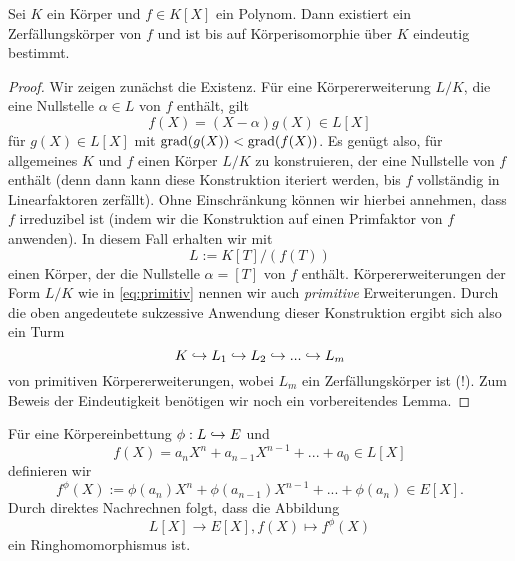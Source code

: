 \documentclass{book}
\begin{document}
\begin{thm}
    \label{thm:zerfexun}
    Sei $K$ ein Körper und $f \in K[X]$ ein Polynom. Dann existiert ein
    Zerfällungskörper von $f$ und ist bis auf Körperisomorphie über $K$
    eindeutig bestimmt.
\end{thm}
\begin{proof}
    Wir zeigen zunächst die Existenz. Für eine Körpererweiterung $L/K$, die eine Nullstelle $\alpha \in L$ von $f$ enthält, gilt
    \[
        f(X) = (X-\alpha) g(X) \in L[X]
    \]
    für $g(X) \in L[X]$ mit $\operatorname{grad}(g(X)) < \operatorname{grad}(f(X))$. Es genügt also, für
    allgemeines $K$ und $f$ einen Körper $L/K$ zu konstruieren, der eine
    Nullstelle von $f$ enthält (denn dann kann diese Konstruktion iteriert
    werden, bis $f$ vollständig in Linearfaktoren zerfällt). Ohne Einschränkung
    können wir hierbei annehmen, dass $f$ irreduzibel ist (indem wir die
    Konstruktion auf einen Primfaktor von $f$ anwenden). In diesem Fall erhalten wir mit
    \begin{equation}
        \label{eq:primitiv}
        L := K[T]/(f(T))
    \end{equation}
    einen Körper, der die Nullstelle $\alpha = [T]$ von $f$ enthält.
    Körpererweiterungen der Form $L/K$ wie in \eqref{eq:primitiv} nennen wir
    auch {\em primitive} Erweiterungen. Durch die oben angedeutete sukzessive
    Anwendung dieser Konstruktion ergibt sich also ein Turm
    \[
        K \hookrightarrow L_1 \hookrightarrow L_2 \hookrightarrow ... \hookrightarrow L_m
    \]
    von primitiven Körpererweiterungen, wobei $L_m$ ein Zerfällungskörper ist
    (!). Zum Beweis der Eindeutigkeit benötigen wir noch ein vorbereitendes Lemma.
\end{proof}

Für eine Körpereinbettung $\phi: L \hra E$ und
\[
    f(X) = a_n X^n + a_{n-1} X^{n-1} + ... + a_0 \in L[X]
\]
definieren wir
\begin{equation}
    \label{eq:hochphi}
    f^{\phi}(X) := \phi(a_n) X^n + \phi(a_{n-1}) X^{n-1} + ... + \phi(a_n) \in E[X].
\end{equation}
Durch direktes Nachrechnen folgt, dass die Abbildung
\begin{equation}\label{eq:koeff}
    L[X] \to E[X], f(X) \mapsto f^{\phi}(X)
\end{equation}
ein Ringhomomorphismus ist. 
\end{document}
